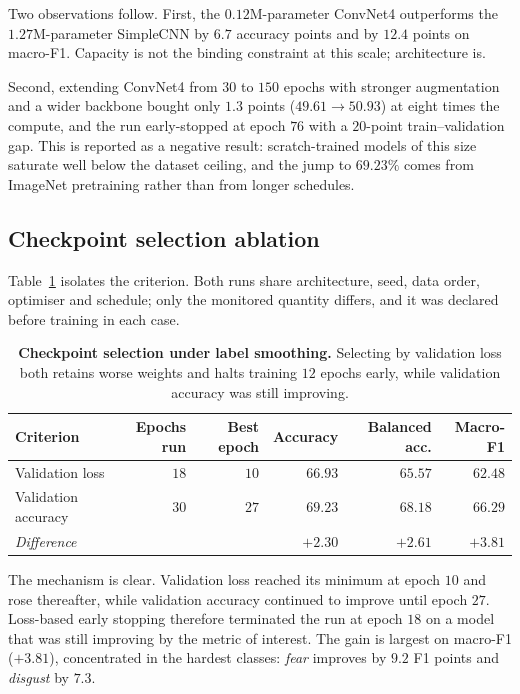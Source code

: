 \documentclass[11pt,a4paper]{article}
\begin{document}
Two observations follow. First, the $0.12$M-parameter ConvNet4 outperforms the
$1.27$M-parameter SimpleCNN by $6.7$ accuracy points and by $12.4$ points on
macro-F1. Capacity is not the binding constraint at this scale; architecture
is.

Second, extending ConvNet4 from $30$ to $150$ epochs with stronger augmentation
and a wider backbone bought only $1.3$ points ($49.61 \to 50.93$) at eight
times the compute, and the run early-stopped at epoch $76$ with a $20$-point
train--validation gap. This is reported as a negative result: scratch-trained
models of this size saturate well below the dataset ceiling, and the jump to
$69.23\%$ comes from ImageNet pretraining rather than from longer schedules.

\subsection{Checkpoint selection ablation}
\label{sec:ablation}
Table~\ref{tab:ckpt} isolates the criterion. Both runs share architecture,
seed, data order, optimiser and schedule; only the monitored quantity differs,
and it was declared before training in each case.

\begin{table}[htbp]
\centering
\small
\begin{tabular}{lrrrrr}
\toprule
Criterion & Epochs run & Best epoch & Accuracy & Balanced acc. & Macro-F1 \\
\midrule
Validation loss     & $18$ & $10$ & $66.93$ & $65.57$ & $62.48$ \\
Validation accuracy & $30$ & $27$ & $\mathbf{69.23}$ & $\mathbf{68.18}$ & $\mathbf{66.29}$ \\
\midrule
\emph{Difference} & & & $+2.30$ & $+2.61$ & $+3.81$ \\
\bottomrule
\end{tabular}
\caption{\textbf{Checkpoint selection under label smoothing.} Selecting by
validation loss both retains worse weights and halts training $12$ epochs
early, while validation accuracy was still improving.}
\label{tab:ckpt}
\end{table}

The mechanism is clear. Validation loss reached its minimum at epoch $10$ and
rose thereafter, while validation accuracy continued to improve until epoch
$27$. Loss-based early stopping therefore terminated the run at epoch $18$ on a
model that was still improving by the metric of interest. The gain is largest
on macro-F1 ($+3.81$), concentrated in the hardest classes: \emph{fear}
improves by $9.2$ F1 points and \emph{disgust} by $7.3$.
\end{document}
